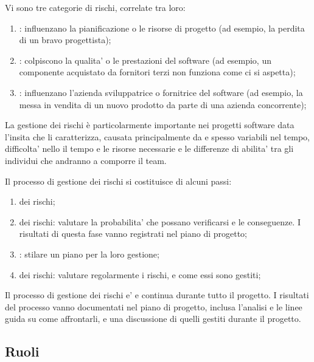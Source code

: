 Vi sono tre categorie di rischi, correlate tra loro:

\begin{enumerate}
  \item {}: influenzano la pianificazione o le risorse
    di progetto (ad esempio, la perdita di un bravo progettista);
  \item {}: colpiscono la qualita' o le prestazioni del
    software (ad esempio, un componente acquistato da fornitori terzi non
    funziona come ci si aspetta);
  \item {}: influenzano l'azienda sviluppatrice o
    fornitrice del software (ad esempio, la messa in vendita di un nuovo
    prodotto da parte di una azienda concorrente);
\end{enumerate}

La gestione dei rischi è particolarmente importante nei progetti software data
l'insita  che li caratterizza, causata principalmente da
 e spesso variabili nel tempo, difficolta' nello
 il tempo e le risorse necessarie e le differenze di abilita'
tra gli individui che andranno a comporre il team.

Il processo di gestione dei rischi si costituisce di alcuni passi:

\begin{enumerate}
  \item {} dei rischi;
  \item {} dei rischi: valutare la probabilita' che possano
    verificarsi e le conseguenze. I risultati di questa fase vanno registrati
    nel piano di progetto;
  \item {}: stilare un piano per la loro gestione;
  \item {} dei rischi: valutare regolarmente i rischi, e come
    essi sono gestiti;
\end{enumerate}

Il processo di gestione dei rischi e'  e continua durante
tutto il progetto. I risultati del processo vanno documentati nel piano di
progetto, inclusa l'analisi e le linee guida su come affrontarli, e una
discussione di quelli gestiti durante il progetto.

\subsection{Ruoli}

